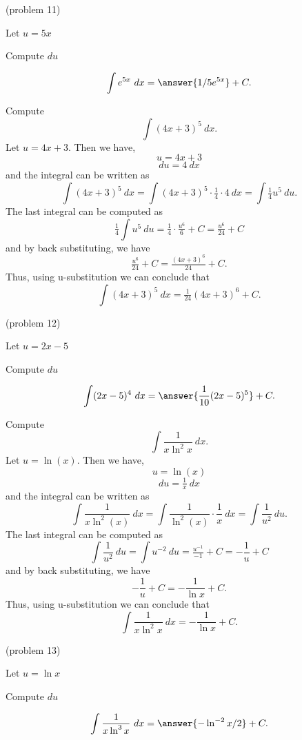\documentclass[handout]{ximera}
\begin{document}
\begin{problem}(problem 11)
\begin{hint}
Let $u = 5x$
\end{hint}
\begin{hint}
Compute $du$
\end{hint}
\[\int e^{5x} \ dx = \answer{1/5 e^{5x}} +C.\]
\end{problem}



\begin{example}[example 12] Compute 
\[\int (4x+3)^5 \ dx.\]
Let $u = 4x+3$. Then we have,
\[u = 4x+3\]
\[du = 4 \ dx\]
and the integral can be written as 
\[\int (4x+3)^5 \ dx =   \int (4x+3)^5 \cdot \tfrac14\cdot 4  \   dx =   \int \tfrac14 u^5 \ du.\]
The last integral can be computed as 
\[\tfrac14  \int u^5 \ du = \tfrac14  \cdot \tfrac{u^6}{6} + C = \tfrac{u^6}{24} + C\]
and by back substituting, we have 
\[\tfrac{u^6}{24} + C = \tfrac{(4x+3)^6}{24}+ C.\]
Thus, using u-substitution we can conclude that
\[\int (4x+3)^5 \ dx = \tfrac{1}{24}(4x+3)^6 + C.\]
\end{example}




\begin{problem}(problem 12)
\begin{hint}
Let $u = 2x - 5$
\end{hint}
\begin{hint}
Compute $du$
\end{hint}
\[\int (2x - 5)^4 \ dx = \answer{\frac{1}{10}(2x-5)^5} +C.\]
\end{problem}



\begin{example}[example 13] Compute 
\[\int \frac{1}{x\ln^2 x} \ dx.\]
Let $u = \ln(x)$. Then we have,
\[u = \ln(x)\]
\[du = \tfrac1x \ dx\]
and the integral can be written as 
\[\int \frac{1}{x\ln^2(x)} \ dx = \int \frac{1}{\ln^2(x)} \cdot \frac{1}{x}\  dx = \int \frac{1}{u^2} \ du.\]
The last integral can be computed as 
\[\int \frac{1}{u^2} \ du = \int u^{-2} \ du = \tfrac{u^{-1}}{-1} + C 
= -\frac{1}{u} + C\]
and by back substituting, we have 
\[-\frac{1}{u} + C =  -\frac{1}{\ln x} + C.\]
Thus, using u-substitution we can conclude that
\[\int \frac{1}{x\ln^2 x} \ dx =  -\frac{1}{\ln x} + C.\]
\end{example}



\begin{problem}(problem 13)
\begin{hint}
Let $u = \ln x$
\end{hint}
\begin{hint}
Compute $du$
\end{hint}
\[\int \frac{1}{x\ln^3 x} \ dx = \answer{- \ln^{-2} x/2} +C.\]
\end{problem}
\end{document}
